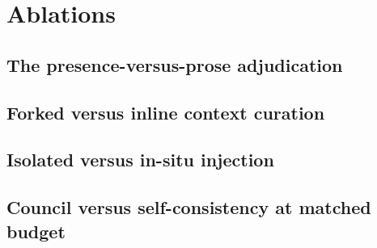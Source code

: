 \section{Ablations}
\label{sec:ablations}

\subsection{The presence-versus-prose adjudication}
%
%
%
%

\subsection{Forked versus inline context curation}
%

\subsection{Isolated versus in-situ injection}
%

\subsection{Council versus self-consistency at matched budget}
%

